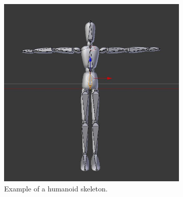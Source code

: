 \begin{figure}[h!]
	\centering
        \begin{subfigure}[b]{0.55\textwidth}
        	\centering
                \includegraphics[width=\linewidth]{img/skeleton}
                \caption{Example of a humanoid skeleton.}
                \label{fig:skeleton}
        \end{subfigure}
        \quad
        \begin{subfigure}[b]{0.4\textwidth}
        	\centering

\end{subfigure}
\end{figure}
